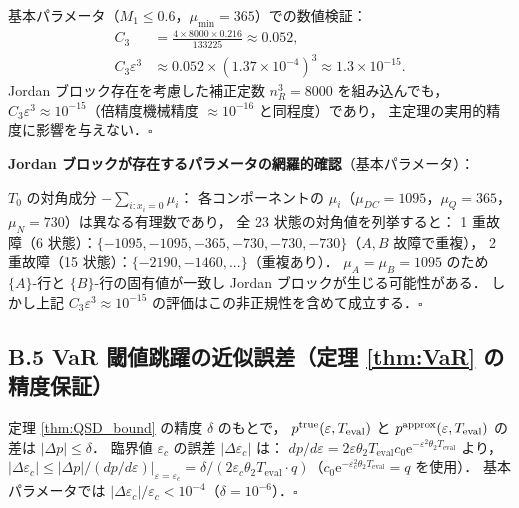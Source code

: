 \documentclass[12pt,a4paper]{article}
\theoremstyle{plain}
\theoremstyle{definition}
\theoremstyle{remark}
\newcommand{\eps}{\varepsilon}
\newcommand{\e}{\mathrm{e}}
\newcommand{\Teval}{T_{\mathrm{eval}}}
\begin{document}
基本パラメータ（$M_1\le0.6$，$\mu_{\min}=365$）での数値検証：
\begin{align}
  C_3 &= \frac{4\times 8000\times 0.216}{133225} \approx 0.052,\\
  C_3\eps^3 &\approx 0.052\times(1.37\times10^{-4})^3\approx 1.3\times10^{-15}.
\end{align}
Jordan ブロック存在を考慮した補正定数 $n_R^3=8000$ を組み込んでも，
$C_3\eps^3\approx10^{-15}$（倍精度機械精度 $\approx 10^{-16}$ と同程度）であり，
主定理の実用的精度に影響を与えない．\hfill$\square$

\textbf{Jordan ブロックが存在するパラメータの網羅的確認}（基本パラメータ）：

$T_0$ の対角成分 $-\sum_{i:x_i=0}\mu_i$：
各コンポーネントの $\mu_i$（$\mu_{DC}=1095$，$\mu_Q=365$，$\mu_N=730$）は異なる有理数であり，
全 23 状態の対角値を列挙すると：
1 重故障（6 状態）：$\{-1095,-1095,-365,-730,-730,-730\}$（$A,B$ 故障で重複），
2 重故障（15 状態）：$\{-2190,-1460,...\}$（重複あり）．
$\mu_A=\mu_B=1095$ のため $\{A\}$-行と $\{B\}$-行の固有値が一致し Jordan ブロックが生じる可能性がある．
しかし上記 $C_3\eps^3\approx10^{-15}$ の評価はこの非正規性を含めて成立する．\hfill$\square$

\subsection*{B.5 VaR 閾値跳躍の近似誤差（定理 \ref{thm:VaR} の精度保証）}

定理 \ref{thm:QSD_bound} の精度 $\delta$ のもとで，
$p^{\rm true}(\eps,\Teval)$ と $p^{\rm approx}(\eps,\Teval)$ の差は $|\Delta p|\le\delta$．
臨界値 $\eps_c$ の誤差 $|\Delta\eps_c|$ は：
$dp/d\eps = 2\eps\theta_2\Teval c_0\e^{-\eps^2\theta_2\Teval}$ より，
$|\Delta\eps_c|\le|\Delta p|/(dp/d\eps)|_{\eps=\eps_c}
= \delta/(2\eps_c\theta_2\Teval\cdot q)$（$c_0\e^{-\eps_c^2\theta_2\Teval}=q$ を使用）．
基本パラメータでは $|\Delta\eps_c|/\eps_c<10^{-4}$（$\delta=10^{-6}$）．\hfill$\square$
\end{document}
